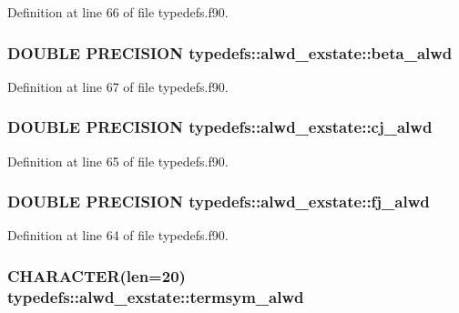 Definition at line 66 of file typedefs.f90.\hypertarget{typetypedefs_1_1alwd__exstate_ade69cd51a1551171ecba3fe034aae174}{
\subsubsection[{beta\_\-alwd}]{\setlength{\rightskip}{0pt plus 5cm}DOUBLE PRECISION {\bf typedefs::alwd\_\-exstate::beta\_\-alwd}}}
\label{typetypedefs_1_1alwd__exstate_ade69cd51a1551171ecba3fe034aae174}


Definition at line 67 of file typedefs.f90.\hypertarget{typetypedefs_1_1alwd__exstate_ab6b82be801ff29ffee0964542c954f40}{
\subsubsection[{cj\_\-alwd}]{\setlength{\rightskip}{0pt plus 5cm}DOUBLE PRECISION {\bf typedefs::alwd\_\-exstate::cj\_\-alwd}}}
\label{typetypedefs_1_1alwd__exstate_ab6b82be801ff29ffee0964542c954f40}


Definition at line 65 of file typedefs.f90.\hypertarget{typetypedefs_1_1alwd__exstate_af4f9dd8da0478384d513170e6a27ed5f}{
\subsubsection[{fj\_\-alwd}]{\setlength{\rightskip}{0pt plus 5cm}DOUBLE PRECISION {\bf typedefs::alwd\_\-exstate::fj\_\-alwd}}}
\label{typetypedefs_1_1alwd__exstate_af4f9dd8da0478384d513170e6a27ed5f}


Definition at line 64 of file typedefs.f90.\hypertarget{typetypedefs_1_1alwd__exstate_a50bb7f5c8fb7c9b0d3163fc8c9d59ffb}{
\subsubsection[{termsym\_\-alwd}]{\setlength{\rightskip}{0pt plus 5cm}CHARACTER(len=20) {\bf typedefs::alwd\_\-exstate::termsym\_\-alwd}}}
\label{typetypedefs_1_1alwd__exstate_a50bb7f5c8fb7c9b0d3163fc8c9d59ffb}


